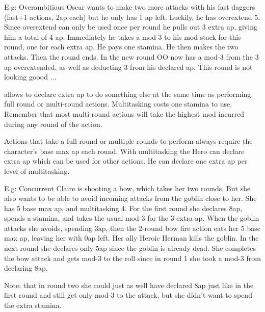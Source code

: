 E.g: Overambitious Oscar wants to make two more attacks with his fast daggers (fast+1 actions, 2ap each) but he only has 1 ap left. Luckily, he has overextend 5. Since overextend can only be used once per round he pulls out 3 extra ap, giving him a total of 4 ap. Immediately he takes a mod-3 to his mod stack for this round, one for each extra ap. He pays one stamina. He then makes the two attacks. Then the round ends. In the new round OO now has a mod-3 from the 3 ap overextended, as well as deducting 3 from his declared ap. This round is not looking goood ...


 allows to declare extra ap to do something else at the same time as performing full round or multi-round actions. Multitasking costs one stamina to use. Remember that most multi-round actions will take the highest mod incurred during any round of the action.

Actions that take a full round or multiple rounds to perform always require the character's base max ap each round. With multitasking the Hero can declare extra ap which can be used for other actions. He can declare one extra ap per level of multitasking.

E.g: Concurrent Claire is shooting a bow, which takes her two rounds. But she also wants to be able to avoid incoming attacks from the goblin close to her. She has 5 base max ap, and multitasking 4. For the first round she declares 8ap, spends a stamina, and takes the usual mod-3 for the 3 extra ap. When the goblin attacks she avoids, spending 3ap, then the 2-round bow fire action eats her 5 base max ap, leaving her with 0ap left. Her ally Heroic Herman kills the goblin. In the next round she declares only 5ap since the goblin is already dead. She completes the bow attack and gets mod-3 to the roll since in round 1 she took a mod-3 from declaring 8ap.

Note: that in round two she could just as well have declared 8ap just like in the first round and still get only mod-3 to the attack, but she didn't want to spend the extra stamina.


%
%
%
%


